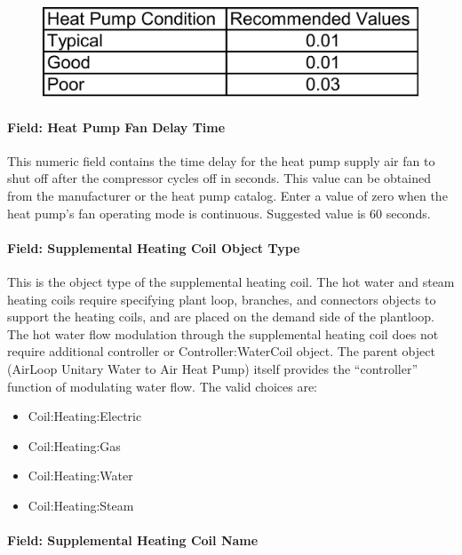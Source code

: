 \begin{figure}[htbp]
\centering
\includegraphics{media/image307.png}
\caption{}
\end{figure}

\paragraph{Field: Heat Pump Fan Delay Time}\label{field-heat-pump-fan-delay-time-1}

This numeric field contains the time delay for the heat pump supply air fan to shut off after the compressor cycles off in seconds. This value can be obtained from the manufacturer or the heat pump catalog. Enter a value of zero when the heat pump's fan operating mode is continuous. Suggested value is 60 seconds.

\paragraph{Field: Supplemental Heating Coil Object Type}\label{field-supplemental-heating-coil-object-type-3}

This is the object type of the supplemental heating coil. The hot water and steam heating coils require specifying plant loop, branches, and connectors objects to support the heating coils, and are placed on the demand side of the plantloop. The hot water flow modulation through the supplemental heating coil does not require additional controller or Controller:WaterCoil object. The parent object (AirLoop Unitary Water to Air Heat Pump) itself provides the ``controller'' function of modulating water flow. The valid choices are:

\begin{itemize}
\item
  Coil:Heating:Electric
\item
  Coil:Heating:Gas
\item
  Coil:Heating:Water
\item
  Coil:Heating:Steam
\end{itemize}

\paragraph{Field: Supplemental Heating Coil Name}\label{field-supplemental-heating-coil-name-3}

